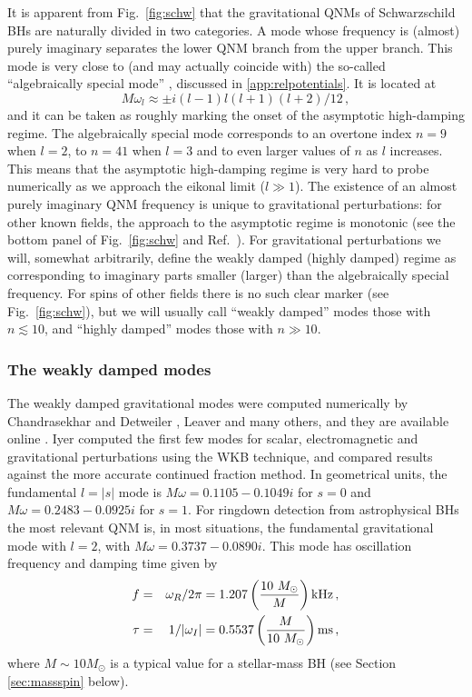 \documentclass[]{iopart}
\def\be{\begin{equation}}
\def\ee{\end{equation}}
\def\beq{\begin{eqnarray}}
\def\eeq{\end{eqnarray}}
\begin{document}
It is apparent from Fig.~\ref{fig:schw} that the gravitational QNMs of
Schwarzschild BHs are naturally divided in two categories. A mode whose
frequency is (almost) purely imaginary separates the lower QNM branch from the
upper branch.  This mode is very close to (and may actually coincide with) the
so-called ``algebraically special mode'' \cite{chandraspecial}, discussed in
\ref{app:relpotentials}. It is located at
%
\be\label{AlgSp}
M \omega_l \approx \pm i (l -1)l (l +1)(l +2)/12\,,
\ee
%
and it can be taken as roughly marking the onset of the asymptotic
high-damping regime. The algebraically special mode corresponds to an overtone
index $n=9$ when $l=2$, to $n=41$ when $l=3$ and to even larger values of $n$
as $l$ increases. This means that the asymptotic high-damping regime is very
hard to probe numerically as we approach the eikonal limit ($l\gg 1$). The
existence of an almost purely imaginary QNM frequency is unique to
gravitational perturbations: for other known fields, the approach to the
asymptotic regime is monotonic (see the bottom panel of Fig.~\ref{fig:schw}
and Ref.~\cite{Cardoso:2003vt}).  For gravitational perturbations we will,
somewhat arbitrarily, define the weakly damped (highly damped) regime as
corresponding to imaginary parts smaller (larger) than the algebraically
special frequency. For spins of other fields there is no such clear marker
(see Fig.~\ref{fig:schw}), but we will usually call ``weakly damped'' modes
those with $n\lesssim 10$, and ``highly damped'' modes those with $n\gg 10$.

\subsubsection*{The weakly damped modes}

The weakly damped gravitational modes were computed numerically by
Chandrasekhar and Detweiler \cite{Chandrasekhar:1975qn}, Leaver
\cite{Leaver:1985ax} and many others, and they are available online
\cite{rdweb}.  Iyer \cite{Iyer:1986nq} computed the first few modes for
scalar, electromagnetic and gravitational perturbations using the WKB
technique, and compared results against the more accurate continued fraction
method.  In geometrical units, the fundamental $l=|s|$ mode is
$M\omega=0.1105-0.1049i$ for $s=0$ and $M\omega=0.2483-0.0925i$ for $s=1$. For
ringdown detection from astrophysical BHs the most relevant QNM is, in most
situations, the fundamental gravitational mode with $l=2$, with
$M\omega=0.3737-0.0890i$. This mode has oscillation frequency and damping time
given by
%
\beq\label{QNMscale}
f&=&\omega_R/2\pi=1.207 \left(\frac{10~M_\odot}{M}\right) {\rm kHz}\,,\\
%
\tau&=&1/|\omega_I|=0.5537 \left(\frac{M}{10~M_\odot}\right) {\rm ms}\,,
\eeq
%
where $M\sim 10M_\odot$ is a typical value for a stellar-mass BH (see Section
\ref{sec:massspin} below).
\end{document}
